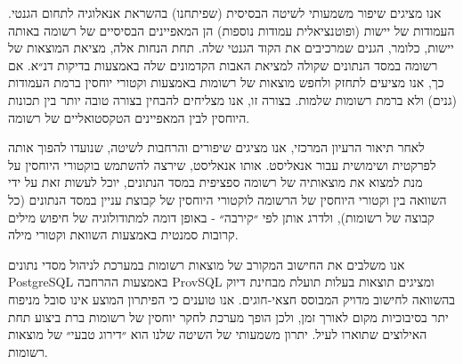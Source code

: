{אנו מציגים שיפור משמעותי לשיטה הבסיסית (שפיתחנו) בהשראת אנאלוגיה לתחום הגנטי.
העמודות של יישות (ופוטנציאלית עמודות נוספות) הן המאפיינים הבסיסיים של רשומה באותה יישות, כלומר, הגנים שמרכיבים את הקוד הגנטי שלה.
תחת הנחות אלה, מציאת המוצאות של רשומה במסד הנתונים שקולה למציאת האבות הקדמונים שלה באמצעות בדיקות דנ״א.
אם כך, אנו מציעים לתחזק ולחפש מוצאות של רשומות באמצעות וקטורי יוחסין ברמת העמודות (גנים) ולא ברמת רשומות שלמות. בצורה זו, אנו מצליחים להבחין בצורה טובה יותר בין תכונות היוחסין לבין המאפיינים הטקסטואליים של רשומה.

לאחר תיאור הרעיון המרכזי, אנו מציגים שיפורים והרחבות לשיטה, שנועדו להפוך אותה לפרקטית ושימושית עבור אנאליסט. אותו אנאליסט, שירצה להשתמש בוקטורי היוחסין על מנת למצוא את מוצאותיה של רשומה ספציפית במסד הנתונים, יוכל לעשות זאת על ידי השוואה בין וקטורי היוחסין של הרשומה לוקטורי היוחסין של קבוצת עניין במסד הנתונים (כל קבוצה של רשומות), ולדרג אותן לפי ״קירבה״ - באופן דומה למתודולוגיה של חיפוש מילים קרובות סמנטית באמצעות השוואת וקטורי מילה.

אנו משלבים את החישוב המקורב של מוצאות רשומות במערכת לניהול מסדי נתונים
\textenglish{PostgreSQL}
באמצעות ההרחבה
\textenglish{ProvSQL}
ומציגים תוצאות בעלות תועלת מבחינת דיוק בהשוואה לחישוב מדויק המבוסס חצאי-חוגים.
אנו טוענים כי הפיתרון המוצע אינו סובל מניפוח יתר בסיבוכיות מקום לאורך זמן,
ולכן הופך מערכת לחקר יוחסין של רשומות ברת ביצוע תחת האילוצים שתוארו לעיל.
יתרון משמעותי של השיטה שלנו הוא ״דירוג טבעי״ של מוצאות רשומות.









}
